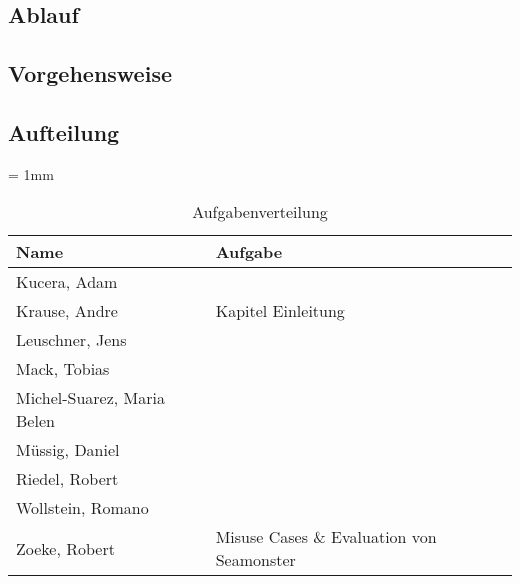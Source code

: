 \subsection{Ablauf}

\subsection{Vorgehensweise}

\subsection{Aufteilung}
\begin{table}[H]
	\sffamily
	\caption{Aufgabenverteilung}
	\tabulinesep = 1mm %
	\centering
		\begin{tabu} to 0.9\textwidth {| X[1.5] | X[3] |}
		\hline
		\textbf{Name} & \textbf{Aufgabe}\\
		\hline 
		Kucera, Adam & \\
		\hline
		Krause, Andre & Kapitel Einleitung\\
		\hline
		Leuschner, Jens & \\
		\hline
		Mack, Tobias & \\
		\hline
		Michel-Suarez, Maria Belen & \\
		\hline
		Müssig, Daniel & \\
		\hline
		Riedel, Robert & \\
		\hline
		Wollstein, Romano & \\
		\hline
		Zoeke, Robert & Misuse Cases \& Evaluation von Seamonster\\
		\hline
	\end{tabu}
\end{table}
